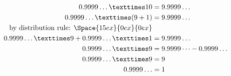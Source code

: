 \begin{align}
    0.9999\ldots × 10 &= 9.9999\ldots\\
    0.9999\ldots × (9+1) &= 9.9999\ldots\\
\text{by distribution rule: }\Space{15ex}{0ex}{0ex} \\
    0.9999\ldots × 9 + 0.9999\ldots × 1 &= 9.9999\ldots\\
    0.9999\ldots × 9 &= 9.9999\dots-0.9999\ldots\\
    0.9999\ldots × 9 &= 9\\
    0.9999\ldots &= 1
\end{align}